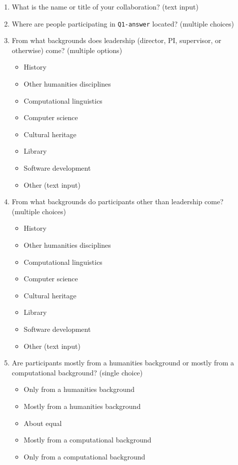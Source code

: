 \documentclass{article}
\begin{document}
\begin{enumerate}
    \item What is the name or title of your collaboration? (text input)
    \item Where are people participating in \texttt{Q1-answer} located? (multiple choices)
    \item From what backgrounds does leadership (director, PI, supervisor, or otherwise) come? (multiple options)
    \begin{itemize}
        \item History
        \item Other humanities disciplines
        \item Computational linguistics
        \item Computer science
        \item Cultural heritage
        \item Library
        \item Software development
        \item Other (text input)
    \end{itemize}
    \item From what backgrounds do participants other than leadership come? (multiple choices)
    \begin{itemize}
        \item History
        \item Other humanities disciplines
        \item Computational linguistics
        \item Computer science
        \item Cultural heritage
        \item Library
        \item Software development
        \item Other (text input)
    \end{itemize}
    \item Are participants mostly from a humanities background or mostly from a computational background? (single choice)
    \begin{itemize}
        \item Only from a humanities background
        \item Mostly from a humanities background
        \item About equal
        \item Mostly from a computational background
        \item Only from a computational background

\end{itemize}
\end{enumerate}
\end{document}
